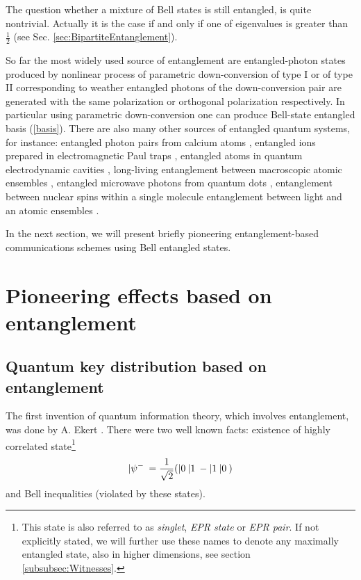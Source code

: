 \documentclass[rmp,12pt,preprint]{revtex4-2}
\begin{document}
The question whether a mixture of Bell states is still entangled, is
quite nontrivial. Actually it is the case if and only if one of
eigenvalues is greater than $\frac{1}{2}$ (see
Sec. \ref{sec:BipartiteEntanglement}).

So far the most widely used source of entanglement are
entangled-photon states produced by nonlinear process of parametric
down-conversion of type I or of type II corresponding to weather
entangled photons of the down-conversion pair are generated with the
same polarization or orthogonal polarization respectively. In
particular using parametric down-conversion one can produce Bell-state
entangled basis (\ref {basis}).  There are also many other sources of
entangled quantum systems, for instance: entangled photon pairs from
calcium atoms \cite {Kocher}, entangled ions prepared in
electromagnetic Paul traps \cite {MeekhofMKIW-ion}, entangled atoms in
quantum electrodynamic cavities \cite {RaimondBH}, long-living
entanglement between macroscopic atomic ensembles \cite {PolzikJK,HaldSSP1999}, entangled microwave photons from quantum
dots \cite {EmaryTB-dot},
entanglement between nuclear spins within a single molecule \cite
{ChenHLL-nuc-spin} entanglement between light and an atomic ensembles
\cite {MuschikHPC-light}.

In the next section, we will present briefly pioneering
entanglement-based communications schemes using Bell entangled states.




\section{Pioneering effects based on entanglement}
\label{sec:effects}

\subsection{Quantum key distribution based on entanglement}
\label{subsec:Ekert}

The first invention of quantum information theory, which involves
entanglement, was done by A. Ekert \cite {E91}. There were two well
known facts: existence of highly correlated state\footnote{This state
  is also referred to as {\it singlet}, {\it EPR state} or {\it EPR
    pair}. If not explicitly stated, we will further use these names to
    denote any maximally entangled state, also in higher dimensions,
    see section \ref{subsubsec:Witnesses}.
    }
\begin{equation}
|\psi^-\> = {1\over \sqrt{2}}(|0\>|1\> - |1\>|0\>)
\label{eq:singlet_dense}
\end{equation}
and Bell inequalities (violated by these states).
\end{document}

